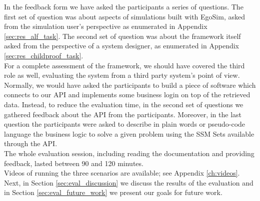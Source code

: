In the feedback form we have asked the participants a series of questions. The first set of question was about aspects of simulations built with EgoSim, asked from the simulation user's perspective as enumerated in Appendix \ref{sec:res_alf_task}. The second set of question was about the framework itself asked from the perspective of a system designer, as enumerated in Appendix \ref{sec:res_childproof_task}.\\

For a complete assessment of the framework, we should have covered the third role as well, evaluating the system from a third party system's point of view. Normally, we would have asked the participants to build a piece of software which connects to our API and implements some business login on top of the retrieved data. Instead, to reduce the evaluation time, in the second set of questions we gathered feedback about the API from the participants. Moreover, in the last question the participants were asked to describe in plain words or pseudo-code language the business logic to solve a given problem using the SSM Sets available through the API.\\

The whole evaluation session, including reading the documentation and providing feedback, lasted between 90 and 120 minutes.\\

Videos of running the three scenarios are available; see Appendix \ref{ch:videos}.\\

Next, in Section \ref{sec:eval_discussion} we discuss the results of the evaluation and in Section \ref{sec:eval_future_work} we present our goals for future work.\\
